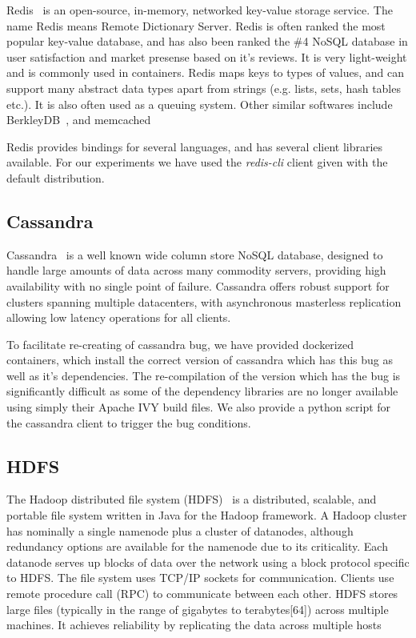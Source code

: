 Redis~\cite{redis} is an open-source, in-memory, networked key-value storage service. 
The name Redis means Remote Dictionary Server. 
Redis is often ranked the most popular key-value database, and has also been ranked the \#4 NoSQL database in user satisfaction and market presense based on it's reviews. 
It is very light-weight and is commonly used in containers.
Redis maps keys to types of values, and can support many abstract data types apart from strings (e.g. lists, sets, hash tables etc.).
It is also often used as a queuing system.
Other similar softwares include BerkleyDB~\cite{berkleyDB}, and memcached~\cite{memcached}

Redis provides bindings for several languages, and has several client libraries available. 
For our experiments we have used the \emph{redis-cli} client given with the default distribution.

\subsection{Cassandra}

Cassandra~\cite{cassandra,cassandraWiki} is a well known wide column store NoSQL database, designed to handle large amounts of data across many commodity servers, providing high availability with no single point of failure.
Cassandra offers robust support for clusters spanning multiple datacenters, with asynchronous masterless replication allowing low latency operations for all clients.

To facilitate re-creating of cassandra bug, we have provided dockerized containers, which install the correct version of cassandra which has this bug as well as it's dependencies. The re-compilation of the version which has the bug is significantly difficult as some of the dependency libraries are no longer available using simply their Apache IVY build files. We also provide a python script for the cassandra client to trigger the bug conditions.

\subsection{HDFS}

The Hadoop distributed file system (HDFS)~\cite{hdfs,hdfsWiki} is a distributed, scalable, and portable file system written in Java for the Hadoop framework.
A Hadoop cluster has nominally a single namenode plus a cluster of datanodes, although redundancy options are available for the namenode due to its criticality. 
Each datanode serves up blocks of data over the network using a block protocol specific to HDFS. The file system uses TCP/IP sockets for communication. Clients use remote procedure call (RPC) to communicate between each other.
HDFS stores large files (typically in the range of gigabytes to terabytes[64]) across multiple machines. It achieves reliability by replicating the data across multiple hosts


